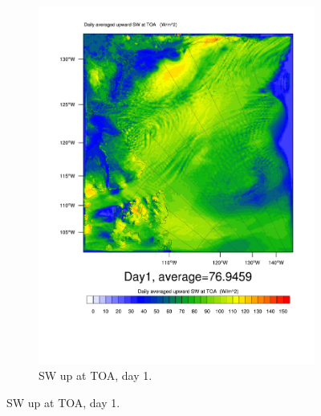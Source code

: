 \begin{figure}
\begin{subfigure}{0.48\textwidth}
		\includegraphics[width=\textwidth]{results/control/SWUPT_Day1.pdf}
		\caption{SW up at TOA, day 1.}
		\label{subfig:swup_r1Day1}
	\end{subfigure}
	

\end{figure}
